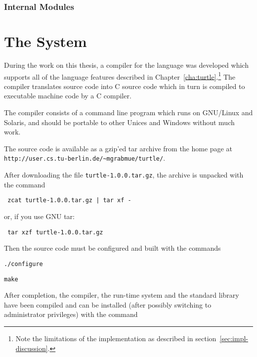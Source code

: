 \begin{appendix}
\subsection*{Internal Modules}

\begin{modules}
\end{modules}

\chapter{The \turtle{} System}
\label{cha:turtle-compiler}

During the work on this thesis, a compiler for the \turtle{} language
was developed which supports all of the language features described in
Chapter~\ref{cha:turtle}.\footnote{Note the limitations of the
  implementation as described in section~\ref{sec:impl-discussion}.}
The compiler translates \turtle{} source code into C source code which
in turn is compiled to executable machine code by a C compiler.

The compiler consists of a command line program which runs on
GNU/Linux and Solaris, and should be portable to other Unices and
Windows without much work.

The source code is available as a gzip'ed tar archive from the
\turtle{} home page at {\tt
  http://user.cs.tu-berlin.de/\~{}mgrabmue/turtle/}.

After downloading the file {\tt turtle-1.0.0.tar.gz}, the archive is
unpacked with the command

{\tt
zcat turtle-1.0.0.tar.gz | tar xf -
}

\noindent
or, if you use GNU tar:

{\tt
tar xzf turtle-1.0.0.tar.gz
}

\noindent
Then the source code must be configured and built with the commands

{\tt ./configure}

{\tt make}

\noindent
After completion, the compiler, the run-time system and the standard
library have been compiled and can be installed (after possibly
switching to administrator privileges) with the command


\end{appendix}
